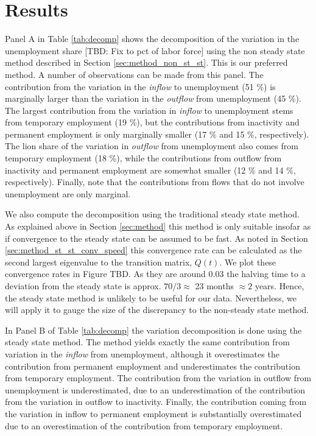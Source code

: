 \section{Results}
\label{sec:Results}



Panel A in Table \ref{tab:decomp} shows the decomposition of the variation in the unemployment share [TBD: Fix to pct of labor force] using the non steady state method described in Section \ref{sec:method_non_st_st}. This is our preferred method. A number of observations can be made from this panel. The contribution from the variation in the \emph{inflow} to unemployment (51 \%) is marginally larger than the variation in the \emph{outflow} from unemployment (45 \%). The largest contribution from the variation in \emph{inflow} to unemployment stems from temporary employment (19 \%), but the contributions from inactivity and permanent employment is only marginally smaller (17 \% and 15 \%, respectively). The lion share of the variation in \emph{outflow} from unemployment also comes from temporary employment (18 \%), while the contributions from outflow from inactivity and permanent employment are somewhat smaller (12 \% and 14 \%, respectively). Finally, note that the contributions from flows that do not involve unemployment are only marginal.

We also compute the decomposition using the traditional steady state method. As explained above in Section \ref{sec:method} this method is only suitable insofar as if convergence to the steady state can be assumed to be fast. As noted in Section \ref{sec:method_st_st_conv_speed} this convergence rate can be calculated as the second largest eigenvalue to the transition matrix, $Q(t)$. We plot these convergence rates in Figure TBD. As they are around $0.03$ the halving time to a deviation from the steady state is approx. $70/3 \approx$ 23 months $\approx 2$ years. Hence, the steady state method is unlikely to be useful for our data. Nevertheless, we will apply it to gauge the size of the discrepancy to the non-steady state method.

In Panel B of Table \ref{tab:decomp} the variation decomposition is done using the steady state method. The method yields exactly the same contribution from variation in the \emph{inflow} from unemployment, although it overestimates the contribution from permanent employment and underestimates the contribution from temporary employment. The contribution from the variation in outflow from unemployment is underestimated, due to an underestimation of the contribution from the variation in outflow to inactivity. Finally, the contribution coming from the variation in inflow to permanent employment is substantially overestimated due to an overestimation of the contribution from temporary employment.

